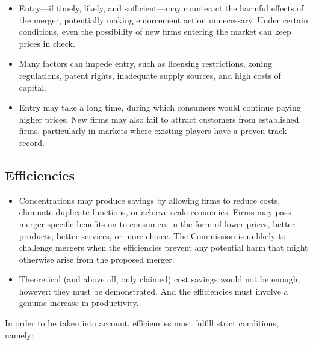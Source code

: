        \begin{itemize}
            \item Entry—if timely, likely, and sufficient—may counteract the harmful effects of the merger, potentially making enforcement action unnecessary. Under certain conditions, even the possibility of new firms entering the market can keep prices in check.
            \item Many factors can impede entry, such as licensing restrictions, zoning regulations, patent rights, inadequate supply sources, and high costs of capital.
            \item Entry may take a long time, during which consumers would continue paying higher prices. New firms may also fail to attract customers from established firms, particularly in markets where existing players have a proven track record.
        \end{itemize}


    \subsection{Efficiencies}\label{ED}

        \begin{itemize}
            \item Concentrations may produce savings by allowing firms to reduce costs, eliminate duplicate functions, or achieve scale economies. Firms may pass merger-specific benefits on to consumers in the form of lower prices, better products, better services, or more choice. The Commission is unlikely to challenge mergers when the efficiencies prevent any potential harm that might otherwise arise from the proposed merger.
            
            \item Theoretical (and above all, only claimed) cost savings would not be enough, however: they must be demonstrated. And the efficiencies must involve a genuine increase in productivity.
        \end{itemize}
        
        In order to be taken into account, efficiencies must fulfill strict conditions, namely:
        

